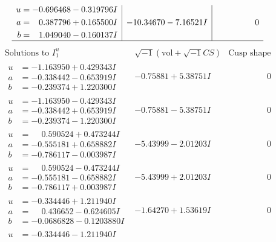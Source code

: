 \documentclass[1p]{elsarticle_modified}
\theoremstyle{definition}
\newcommand{\I}{\sqrt{-1}}
\begin{document}
$$\begin{array}{c|c|c}
\begin{aligned}
u &= -0.696468 - 0.319796 I \\
a &= \phantom{-}0.387796 + 0.165500 I \\
b &= \phantom{-}1.049040 - 0.160137 I\end{aligned}
 & -10.34670 - 7.16521 I & \phantom{-0.000000 } 0\\
 \hline 
 \end{array}$$\newpage$$\begin{array}{c|c|c}  
\text{Solutions to }I^u_{1}& \I (\text{vol} + \sqrt{-1}CS) & \text{Cusp shape}\\
 \hline 
\begin{aligned}
u &= -1.163950 + 0.429343 I \\
a &= -0.338442 - 0.653919 I \\
b &= -0.239374 + 1.220300 I\end{aligned}
 & -0.75881 + 5.38751 I & \phantom{-0.000000 } 0 \\ \hline\begin{aligned}
u &= -1.163950 - 0.429343 I \\
a &= -0.338442 + 0.653919 I \\
b &= -0.239374 - 1.220300 I\end{aligned}
 & -0.75881 - 5.38751 I & \phantom{-0.000000 } 0 \\ \hline\begin{aligned}
u &= \phantom{-}0.590524 + 0.473244 I \\
a &= -0.555181 + 0.658882 I \\
b &= -0.786117 - 0.003987 I\end{aligned}
 & -5.43999 - 2.01203 I & \phantom{-0.000000 } 0 \\ \hline\begin{aligned}
u &= \phantom{-}0.590524 - 0.473244 I \\
a &= -0.555181 - 0.658882 I \\
b &= -0.786117 + 0.003987 I\end{aligned}
 & -5.43999 + 2.01203 I & \phantom{-0.000000 } 0 \\ \hline\begin{aligned}
u &= -0.334446 + 1.211940 I \\
a &= \phantom{-}0.436652 - 0.624605 I \\
b &= -0.0686828 - 0.1203880 I\end{aligned}
 & -1.64270 + 1.53619 I & \phantom{-0.000000 } 0 \\ \hline\begin{aligned}
u &= -0.334446 - 1.211940 I \\

\end{aligned}
\end{array}$$
\end{document}
